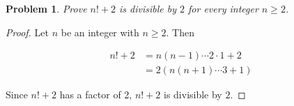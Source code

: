 \documentclass{article}
\newtheorem{problem}{Problem}
\begin{document}
\begin{problem}
Prove $n!+2$ is divisible by $2$ for every integer $n \ge 2$.
\end{problem}

\begin{proof}
Let $n$ be an integer with $n \ge 2$. Then

\begin{align*}
n!+2&=n(n-1)\cdots2\cdot1+2\\
&=2(n(n+1)\cdots3+1)
\end{align*}

Since $n!+2$ has a factor of 2, $n!+2$ is divisible by $2$.
\end{proof}
\end{document}
